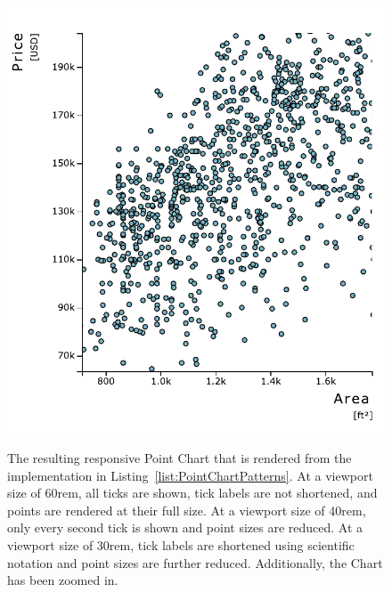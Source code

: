 \begin{figure}[tp]
{  \includegraphics[valign=b,scale=\respscale]{diagrams/respvis-point-30rem-zoomed.pdf}%
  \label{fig:PointChartPatterns30remZoomed}%
}
\caption[Responsive RespVis Point Chart]{
  The resulting responsive Point Chart that is rendered from the implementation in Listing~\ref{list:PointChartPatterns}.
   At a viewport size of 60rem, all ticks are shown, tick labels are not shortened, and points are rendered at their full size. 
   At a viewport size of 40rem, only every second tick is shown and point sizes are reduced.
   At a viewport size of 30rem, tick labels are shortened using scientific notation and point sizes are further reduced. Additionally, the Chart has been zoomed in.
}
\label{fig:PointChartPatterns}
\end{figure}
